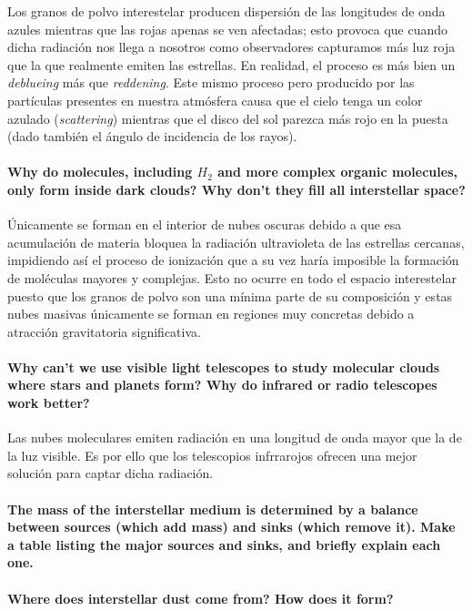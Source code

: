 \documentclass{tufte-handout}
\begin{document}
Los granos de polvo interestelar producen dispersión de las longitudes de onda azules mientras que las rojas apenas se ven afectadas; esto provoca que cuando dicha radiación nos llega a nosotros como observadores capturamos más luz roja que la que realmente emiten las estrellas. En realidad, el proceso es más bien un \emph{deblueing} más que \emph{reddening}. Este mismo proceso pero producido por las partículas presentes en nuestra atmósfera causa que el cielo tenga un color azulado (\emph{scattering}) mientras que el disco del sol parezca más rojo en la puesta (dado también el ángulo de incidencia de los rayos).

\paragraph{\textbf{Why do molecules, including $H_2$ and more complex organic molecules, only form inside dark clouds? Why
don’t they fill all interstellar space?}}

Únicamente se forman en el interior de nubes oscuras debido a que esa acumulación de materia bloquea la radiación ultravioleta de las estrellas cercanas, impidiendo así el proceso de ionización que a su vez haría imposible la formación de moléculas mayores y complejas. Esto no ocurre en todo el espacio interestelar puesto que los granos de polvo son una mínima parte de su composición y estas nubes masivas únicamente se forman en regiones muy concretas debido a atracción gravitatoria significativa.

\paragraph{\textbf{Why can't we use visible light telescopes to study molecular clouds where stars and planets form? Why do
infrared or radio telescopes work better?}}

Las nubes moleculares emiten radiación en una longitud de onda mayor que la de la luz visible. Es por ello que los telescopios infrrarojos ofrecen una mejor solución para captar dicha radiación.

\paragraph{The mass of the interstellar medium is determined by a balance between sources (which add mass) and
sinks (which remove it). Make a table listing the major sources and sinks, and briefly explain each one.}

\paragraph{Where does interstellar dust come from? How does it form?}
\end{document}
